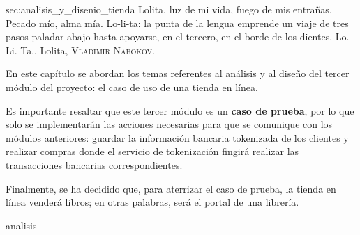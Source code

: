 %
%

   {sec:analisis_y_disenio_tienda}
{
  \epigrafe
  {%
    Lolita, luz de mi vida, fuego de mis entrañas. Pecado mío, alma mía.
    Lo-li-ta: la punta de la lengua emprende un viaje de tres pasos paladar
    abajo hasta apoyarse, en el tercero, en el borde de los dientes.
    Lo. Li. Ta..%
  }
  {%
    Lolita,
    \textsc{Vladimir Nabokov}.%
  }
}

\noindent
En este capítulo se abordan los temas referentes al análisis y al diseño del
tercer módulo del proyecto: el caso de uso de una tienda en línea.

Es importante resaltar que este tercer módulo es un \textbf{caso de prueba},
por lo que solo se implementarán las acciones necesarias para que se comunique
con los módulos anteriores: guardar la información bancaria tokenizada de los
clientes y realizar compras donde el servicio de tokenización fingirá realizar
las transacciones bancarias correspondientes.

Finalmente, se ha decidido que, para aterrizar el caso de prueba, la tienda en
línea venderá libros; en otras palabras, será el portal de una librería.

{analisis}

